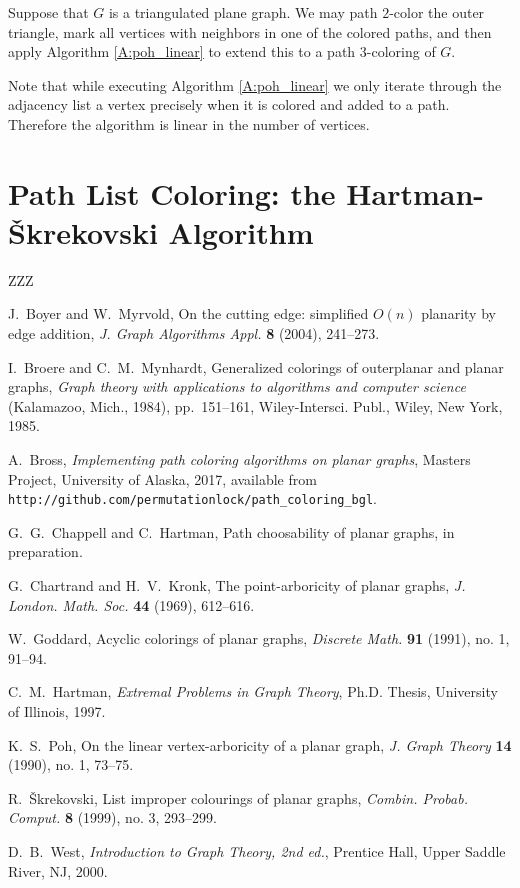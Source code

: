 \documentclass[12pt,letterpaper]{article}
\theoremstyle{plain}
\theoremstyle{definition}
\theoremstyle{break}
\begin{document}
Suppose that $G$ is a triangulated plane graph. We may path $2$-color the outer
triangle, mark all vertices with neighbors in one of the colored paths, and
then apply Algorithm \ref{A:poh_linear} to extend this to a path
$3$-coloring of $G$.

Note that while executing Algorithm \ref{A:poh_linear} we only iterate through
the adjacency list a vertex precisely when it is colored and added
to a path. Therefore the algorithm is linear in the number of vertices.

\section{Path List Coloring: the Hartman-\v{S}krekovski Algorithm}

ZZZ


\begin{thebibliography}{99}

J.~Boyer and W.~Myrvold, On the cutting edge: simplified $O(n)$ planarity by edge
addition,
\textit{J. Graph Algorithms Appl.}
\textbf{8} (2004),
241--273.

I.~Broere and C.~M.~Mynhardt,
Generalized colorings of outerplanar and planar graphs,
\textit{Graph theory with applications to algorithms and computer science}
 (Kalamazoo, Mich., 1984),
pp.~151--161,
Wiley-Intersci. Publ., Wiley, New York, 1985.

A.~Bross,
\textit{Implementing path coloring algorithms on planar graphs},
Masters Project,
University of Alaska,
2017,
available from\hfil\break
\texttt{http://github.com/permutationlock/path\_coloring\_bgl}.

G.~G.~Chappell and C.~Hartman,
Path choosability of planar graphs,
in preparation.

G.~Chartrand and H.~V.~Kronk,
The point-arboricity of planar graphs,
\textit{J. London. Math. Soc.}
\textbf{44} (1969),
612--616.

W.~Goddard,
Acyclic colorings of planar graphs,
\textit{Discrete Math.}
\textbf{91} (1991), no. 1,
91--94.

C.~M.~Hartman,
\textit{Extremal Problems in Graph Theory},
Ph.D. Thesis,
University of Illinois,
1997.

K.~S.~Poh,
On the linear vertex-arboricity of a planar graph,
\textit{J. Graph Theory}
\textbf{14} (1990), no. 1,
73--75.

R.~\v{S}krekovski,
List improper colourings of planar graphs,
\textit{Combin. Probab. Comput.}
\textbf{8} (1999), no. 3,
293--299.

D.~B.~West,
\textit{Introduction to Graph Theory, 2nd ed.},
Prentice Hall,
Upper Saddle River, NJ,
2000.

\end{thebibliography}
\end{document}
